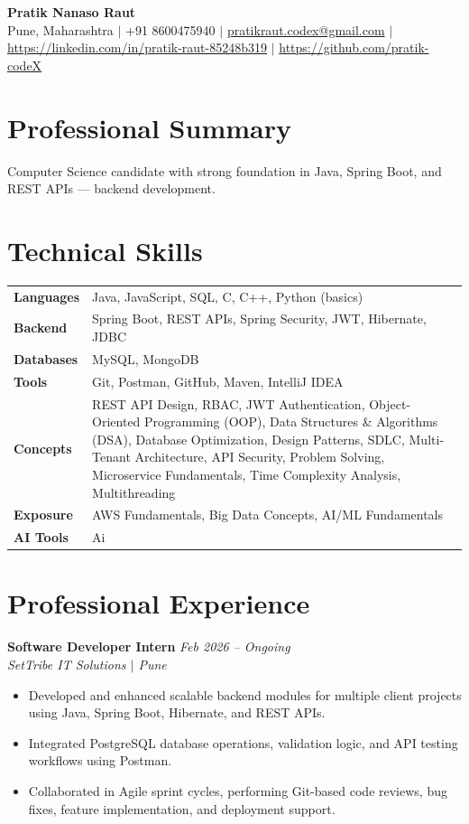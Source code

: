 \documentclass[10.5pt,a4paper]{article}
\begin{document}
\begin{center}
{\Large\bfseries Pratik Nanaso Raut}\\[2pt]
Pune, Maharashtra $|$ +91 8600475940 $|$ \href{mailto:pratikraut.codex@gmail.com}{pratikraut.codex@gmail.com} $|$ \href{https://linkedin.com/in/pratik-raut-85248b319}{https://linkedin.com/in/pratik-raut-85248b319} $|$ \href{https://github.com/pratik-codeX}{https://github.com/pratik-codeX}
\end{center}
\vspace{-2pt}
\section{Professional Summary}
Computer Science candidate with strong foundation in Java, Spring Boot, and REST APIs — backend development.
\section{Technical Skills}
\begin{tabular}{@{}p{}p{}@{}}
\textbf{Languages} & Java, JavaScript, SQL, C, C++, Python (basics) \\[1pt]
\textbf{Backend} & Spring Boot, REST APIs, Spring Security, JWT, Hibernate, JDBC \\[1pt]
\textbf{Databases} & MySQL, MongoDB \\[1pt]
\textbf{Tools} & Git, Postman, GitHub, Maven, IntelliJ IDEA \\[1pt]
\textbf{Concepts} & REST API Design, RBAC, JWT Authentication, Object-Oriented Programming (OOP), Data Structures \& Algorithms (DSA), Database Optimization, Design Patterns, SDLC, Multi-Tenant Architecture, API Security, Problem Solving, Microservice Fundamentals, Time Complexity Analysis, Multithreading \\[1pt]
\textbf{Exposure} & AWS Fundamentals, Big Data Concepts, AI/ML Fundamentals \\[1pt]
\textbf{AI Tools} & Ai \\
\end{tabular}
\section{Professional Experience}
\textbf{Software Developer Intern} \hfill \textit{Feb 2026 -- Ongoing}
\\\textit{SetTribe IT Solutions $|$ Pune}
\begin{itemize}
  \item Developed and enhanced scalable backend modules for multiple client projects using Java, Spring Boot, Hibernate, and REST APIs.
  \item Integrated PostgreSQL database operations, validation logic, and API testing workflows using Postman.
  \item Collaborated in Agile sprint cycles, performing Git-based code reviews, bug fixes, feature implementation, and deployment support.
\end{itemize}
\end{document}
